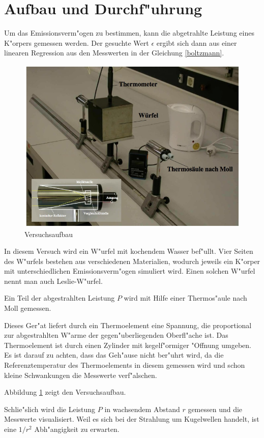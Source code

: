 \section{Aufbau und Durchf"uhrung}
	\label{sec:durchfuehrung}

	Um das Emissionsverm"ogen zu bestimmen, kann die abgetrahlte Leistung eines K"orpers gemessen werden.
	Der gesuchte Wert $\epsilon$ ergibt sich dann aus einer linearen Regression aus den Messwerten in der Gleichung \eqref{boltzmann}.

	\begin{figure}[h!]
		\centering
		\includegraphics[width = 15cm]{img/aufbau.JPG}
		\caption{Versuchsaufbau}
		\label{fig:aufbau}
	\end{figure}

	In diesem Versuch wird ein W"urfel mit kochendem Wasser bef"ullt.
	Vier Seiten des W"urfels bestehen aus verschiedenen Materialien, wodurch jeweils ein K"orper mit unterschiedlichen Emissionsverm"ogen simuliert wird.
	Einen solchen W"urfel nennt man auch Leslie-W"urfel.

	Ein Teil der abgestrahlten Leistung $P$ wird mit Hilfe einer Thermos"aule nach Moll gemessen.

	Dieses Ger"at liefert durch ein Thermoelement eine Spannung, die proportional zur ab\-ge\-strahl\-ten W"arme der gegen"uberliegenden Oberfl"ache ist.
	Das Thermoelement ist durch einen Zylinder mit kegelf"ormiger "Offnung umgeben.
	Es ist darauf zu achten, dass das Geh"ause nicht ber"uhrt wird, da die Referenztemperatur des Thermoelements in diesem gemessen wird und schon kleine Schwankungen die Messwerte verf"alschen.

	Abbildung \ref{fig:aufbau} zeigt den Versuchsaufbau.


	Schlie"slich wird die Leistung $P$ in wachsendem Abstand $r$ gemessen und die Messwerte visualisiert.
	Weil es sich bei der Strahlung um Kugelwellen handelt, ist eine $1 / r^2$ Abh"angigkeit zu erwarten.